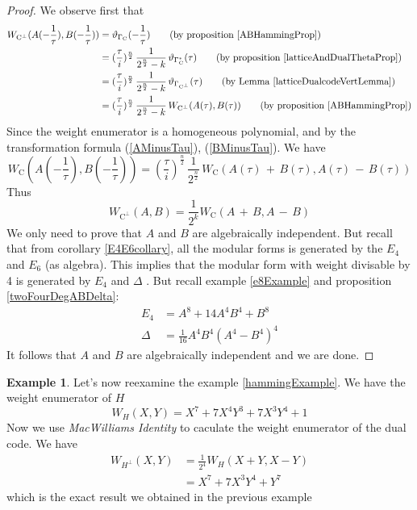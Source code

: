 \documentclass[12pt]{article}
\theoremstyle{definition}
\newtheorem{example}[theorem]{Example}
\numberwithin{equation}{theorem}
\numberwithin{figure}{theorem}
\newcommand{\simpleCodes}{\ensuremath{\mathrm{C}}}
\newcommand{\buildVertical}[1]{\ensuremath{#1^{\bot}}}
\newcommand{\buildLattice}[1]{\ensuremath{\Gamma_{#1}}}
\newcommand{\weightEnumerator}[3]{\ensuremath{W_{#1}(#2,#3)}}
\newcommand{\thetaFunction}[1]{\ensuremath{\vartheta_{#1}}}
\newcommand{\imaginary}{\ensuremath{i}}
\begin{document}
\begin{proof}
We observe first that
\begin{align*}
	\weightEnumerator{\buildVertical{\simpleCodes}}{A(-\frac{1}{\tau})}{B(-\frac{1}{\tau})} &= \thetaFunction{\buildLattice{\simpleCodes}}(-\frac{1}{\tau}) \tag{by proposition \ref{ABHammingProp}} \\ %
	&= (\frac{\tau}{\imaginary})^{\frac{n}{2}} \, \frac{1}{2^{\frac{n}{2}} - k} \,\thetaFunction{\buildLattice{\simpleCodes}^*}(\tau) \tag{by proposition \ref{latticeAndDualThetaProp}}\\  %
		&= (\frac{\tau}{\imaginary})^{\frac{n}{2}} \, \frac{1}{2^{\frac{n}{2}} - k} \,\thetaFunction{\buildLattice{\buildVertical{\simpleCodes}}}(\tau)\tag{by Lemma \ref{latticeDualcodeVertLemma}}\\ %
		&= (\frac{\tau}{\imaginary})^{\frac{n}{2}} \, \frac{1}{2^{\frac{n}{2}} - k} \,\weightEnumerator{\buildVertical{\simpleCodes}}{A(\tau)}{B(\tau)} \tag{by proposition \ref{ABHammingProp}}
\end{align*}
Since the weight enumerator is a homogeneous polynomial, and by the transformation formula (\ref{AMinusTau}), (\ref{BMinusTau}). We have
\[
	\weightEnumerator{\simpleCodes}{A(-\frac{1}{\tau})}{B(-\frac{1}{\tau})} = (\frac{\tau}{\imaginary})^{\frac{n}{2}} \, \frac{1}{2^{\frac{n}{2}}} \, \weightEnumerator{\simpleCodes}{A(\tau)\, + \,B(\tau)}{A(\tau) \,- \,B(\tau)}
\]
Thus
\[
	\weightEnumerator{\buildVertical{\simpleCodes}}{A}{B} = \frac{1}{2^k} \weightEnumerator{\simpleCodes}{A \,+\, B}{A \, - \, B}
\]
We only need to prove that $A$ and $B$ are algebraically independent. But recall that from corollary \ref{E4E6collary}, all the modular forms is generated by the $E_4$ and $E_6$ (as algebra). This implies that the modular form with weight divisable by 4 is generated by $E_4$ and $\Delta$ . But recall example \ref{e8Example} and proposition \ref{twoFourDegABDelta}:
\begin{align*}
	E_4 &= A^8 + 14A^4B^4 + B^8\\
	\Delta &= \frac{1}{16}A^4B^4(A^4 - B^4)^4
\end{align*}
It follows that $A$ and $B$ are algebraically independent and we are done.
\end{proof}
\begin{example}\label{macWilliamsHamingExample}
Let's now reexamine the example \ref{hammingExample}.
We have the weight enumerator of $H$
\[
	\weightEnumerator{H}{X}{Y} = X^7 + 7X^4Y^3 + 7X^3Y^4 + 1
\]
Now we use \emph{MacWilliams Identity} to caculate the weight enumerator of the dual code. We have
\begin{align*}
	\weightEnumerator{\buildVertical{H}}{X}{Y} 
	&= \frac{1}{2^4}\weightEnumerator{H}{X+Y}{X-Y}\\
	&= X^7 + 7X^3Y^4 + Y^7
\end{align*}
which is the exact result we obtained in the previous example
\end{example}
\end{document}
